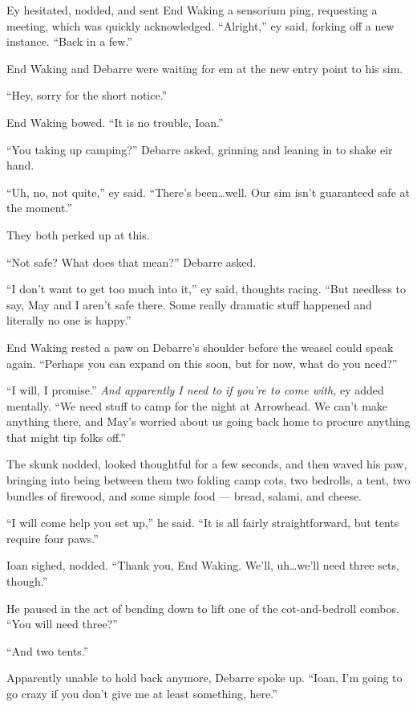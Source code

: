 Ey hesitated, nodded, and sent End Waking a sensorium ping, requesting a meeting, which was quickly acknowledged. ``Alright,'' ey said, forking off a new instance. ``Back in a few.''

End Waking and Debarre were waiting for em at the new entry point to his sim.

``Hey, sorry for the short notice.''

End Waking bowed. ``It is no trouble, Ioan.''

``You taking up camping?'' Debarre asked, grinning and leaning in to shake eir hand.

``Uh, no, not quite,'' ey said. ``There's been\ldots well. Our sim isn't guaranteed safe at the moment.''

They both perked up at this.

``Not safe? What does that mean?'' Debarre asked.

``I don't want to get too much into it,'' ey said, thoughts racing. ``But needless to say, May and I aren't safe there. Some really dramatic stuff happened and literally no one is happy.''

End Waking rested a paw on Debarre's shoulder before the weasel could speak again. ``Perhaps you can expand on this soon, but for now, what do you need?''

``I will, I promise.'' \emph{And apparently I need to if you're to come with,} ey added mentally. ``We need stuff to camp for the night at Arrowhead. We can't make anything there, and May's worried about us going back home to procure anything that might tip folks off.''

The skunk nodded, looked thoughtful for a few seconds, and then waved his paw, bringing into being between them two folding camp cots, two bedrolls, a tent, two bundles of firewood, and some simple food — bread, salami, and cheese.

``I will come help you set up,'' he said. ``It is all fairly straightforward, but tents require four paws.''

Ioan sighed, nodded. ``Thank you, End Waking. We'll, uh\ldots we'll need three sets, though.''

He paused in the act of bending down to lift one of the cot-and-bedroll combos. ``You will need three?''

``And two tents.''

Apparently unable to hold back anymore, Debarre spoke up. ``Ioan, I'm going to go crazy if you don't give me at least something, here.''


